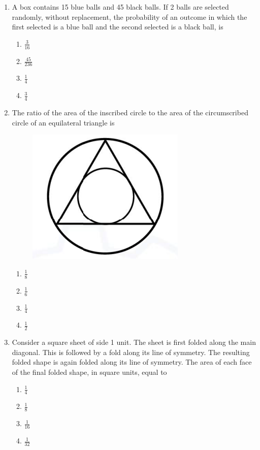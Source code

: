 \documentclass[journal]{IEEEtran}
\theoremstyle{remark}
\begin{document}
\begin{enumerate}
\item A box contains 15 blue balls and 45 black balls. If 2 balls are selected randomly, without replacement, the probability of an outcome in which the first selected is a blue ball and the second selected is a black ball, is \hfill{}
\begin{multicols}{4}
\begin{enumerate}
\item $\frac{3}{16}$
\item $\frac{45}{236}$
\item $\frac{1}{4}$
\item $\frac{3}{4}$
\end{enumerate}
\end{multicols}

\item The ratio of the area of the inscribed circle to the area of the circumscribed circle of an equilateral triangle is \hfill{}
\begin{figure}[H]
    \centering
    \includegraphics[width=0.2\columnwidth]{figs/Q.8 GA.png}
    \caption{}
    \label{fig:placeholder}
\end{figure}
\begin{multicols}{4}
\begin{enumerate}
\item $\frac{1}{8}$
\item $\frac{1}{6}$
\item $\frac{1}{4}$
\item $\frac{1}{2}$
\end{enumerate}
\end{multicols}

\item Consider a square sheet of side 1 unit. The sheet is first folded along the main diagonal. This is followed by a fold along its line of symmetry. The resulting folded shape is again folded along its line of symmetry. The area of each face of the final folded shape, in square units, equal to \hfill{}
\begin{multicols}{4}
\begin{enumerate}
\item $\frac{1}{4}$
\item $\frac{1}{8}$
\item $\frac{1}{16}$
\item $\frac{1}{32}$
\end{enumerate}
\end{multicols}


\end{enumerate}
\end{document}
